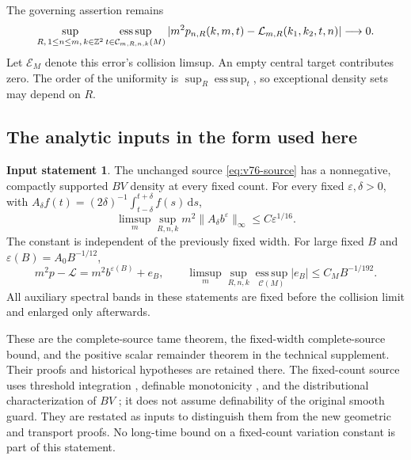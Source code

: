 \documentclass[11pt,reqno]{amsart}
\numberwithin{equation}{section}
\theoremstyle{definition}\newtheorem{definition}[theorem]{Definition}
\theoremstyle{remark}\newtheorem{remark}[theorem]{Remark}
\newcommand{\dd}{\,\mathrm d}\newcommand{\one}{\mathbf1}
\theoremstyle{definition}\newtheorem{inputstatement}[theorem]{Input statement}
\newcommand{\esssup}{\operatorname*{ess\,sup}}
\begin{document}
The governing assertion remains
\begin{equation}\label{eq:v76-target}
 \sup_{R,\,1\le n\le m,\,k\in\Z^2}
 \esssup_{t\in\mathcal C_{m,R,n,k}(M)}
 |m^2p_{n,R}(k,m,t)-\mathcal L_{m,R}(k_1,k_2,t,n)|\longrightarrow0.
\end{equation}
Let $\mathcal E_M$ denote this error's collision limsup. An empty
central target contributes zero. The order of the uniformity is
$\sup_R\esssup_t$, so exceptional density sets may depend on $R$.

\subsection{The analytic inputs in the form used here}
\begin{inputstatement}\label{input:v76-analytic}
The unchanged source \eqref{eq:v76-source} has a nonnegative,
compactly supported $BV$ density at every fixed count. For every
fixed $\varepsilon,\delta>0$, with
$A_\delta f(t)=(2\delta)^{-1}\int_{t-\delta}^{t+\delta}f(s)\dd s$,
\begin{equation}\label{eq:v76-average}
 \limsup_m\sup_{R,n,k}m^2\|A_\delta b^\varepsilon\|_\infty
                                      \le C\varepsilon^{1/16}.
\end{equation}
The constant is independent of the previously fixed width. For large
fixed $B$ and $\varepsilon(B)=A_0B^{-1/12}$,
\begin{equation}\label{eq:v76-remainder}
 m^2p-\mathcal L=m^2b^{\varepsilon(B)}+e_B,\qquad
 \limsup_m\sup_{R,n,k}\esssup_{\mathcal C(M)}|e_B|
                                     \le C_MB^{-1/192}.
\end{equation}
All auxiliary spectral bands in these statements are fixed before
the collision limit and enlarged only afterwards.
\end{inputstatement}
These are the complete-source tame theorem, the fixed-width
complete-source bound, and the positive scalar remainder theorem in
the technical supplement. Their proofs and historical hypotheses are
retained there. The fixed-count source uses threshold integration
\cite{CMInt}, definable monotonicity \cite{Coste}, and the
distributional characterization of $BV$ \cite{AFP}; it does not
assume definability of the original smooth guard. They are restated as inputs to distinguish them from
the new geometric and transport proofs. No long-time bound on a
fixed-count variation constant is part of this statement.
\end{document}
